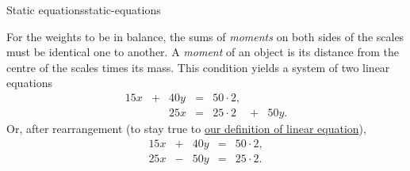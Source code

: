 \begin{example}{Static equations}{static-equations}
\begin{figure}[H]
\begin{subfigure}[b]{.45\textwidth}
  \end{subfigure}
 \end{figure}

 For the weights to be in balance, the sums of \emph{moments} on both sides of
 the scales must be identical one to another. A \emph{moment} of an object is
 its distance from the centre of the scales times its mass. This condition
 yields a system of two linear equations
 \[
  \begin{array}{ccccccc}
   15x & + & 40y & = & 50 \cdot 2, & &\\
       &   & 25x & = & 25 \cdot 2 & + & 50y.
  \end{array}
 \]
 Or, after rearrangement (to stay true to \hyperref[def:linear-equation]{our
 definition of linear equation}),
 \[
  \begin{array}{ccccc}
   15x & + & 40y & = & 50 \cdot 2,\\
   25x & - & 50y & = & 25 \cdot 2.
  \end{array}
 \]
\end{example}

